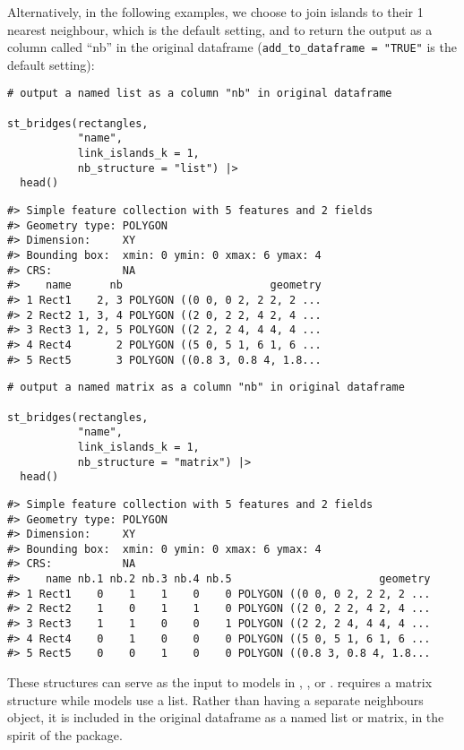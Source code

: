 Alternatively, in the following examples, we choose to join islands to their 1 nearest
neighbour, which is the default setting, and to return the output as a column called ``nb'' in the original
 dataframe (\texttt{add\_to\_dataframe\ =\ "TRUE"} is the default setting):

\begin{verbatim}
# output a named list as a column "nb" in original dataframe

st_bridges(rectangles, 
           "name", 
           link_islands_k = 1, 
           nb_structure = "list") |> 
  head()
\end{verbatim}

\begin{verbatim}
#> Simple feature collection with 5 features and 2 fields
#> Geometry type: POLYGON
#> Dimension:     XY
#> Bounding box:  xmin: 0 ymin: 0 xmax: 6 ymax: 4
#> CRS:           NA
#>    name      nb                       geometry
#> 1 Rect1    2, 3 POLYGON ((0 0, 0 2, 2 2, 2 ...
#> 2 Rect2 1, 3, 4 POLYGON ((2 0, 2 2, 4 2, 4 ...
#> 3 Rect3 1, 2, 5 POLYGON ((2 2, 2 4, 4 4, 4 ...
#> 4 Rect4       2 POLYGON ((5 0, 5 1, 6 1, 6 ...
#> 5 Rect5       3 POLYGON ((0.8 3, 0.8 4, 1.8...
\end{verbatim}

\begin{verbatim}
# output a named matrix as a column "nb" in original dataframe

st_bridges(rectangles, 
           "name", 
           link_islands_k = 1, 
           nb_structure = "matrix") |> 
  head()
\end{verbatim}

\begin{verbatim}
#> Simple feature collection with 5 features and 2 fields
#> Geometry type: POLYGON
#> Dimension:     XY
#> Bounding box:  xmin: 0 ymin: 0 xmax: 6 ymax: 4
#> CRS:           NA
#>    name nb.1 nb.2 nb.3 nb.4 nb.5                       geometry
#> 1 Rect1    0    1    1    0    0 POLYGON ((0 0, 0 2, 2 2, 2 ...
#> 2 Rect2    1    0    1    1    0 POLYGON ((2 0, 2 2, 4 2, 4 ...
#> 3 Rect3    1    1    0    0    1 POLYGON ((2 2, 2 4, 4 4, 4 ...
#> 4 Rect4    0    1    0    0    0 POLYGON ((5 0, 5 1, 6 1, 6 ...
#> 5 Rect5    0    0    1    0    0 POLYGON ((0.8 3, 0.8 4, 1.8...
\end{verbatim}

These structures can serve as the input to models in ,
,  \citep{rstan} or .  requires a matrix structure while  models use a list. Rather than having a separate neighbours
object, it is included in the original  dataframe as a named list or matrix, in the spirit of the  package.

